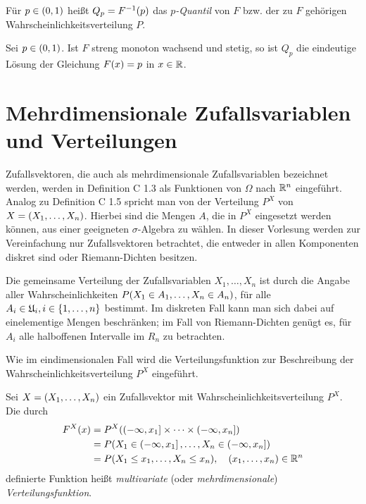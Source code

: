 \documentclass{lecture}
\begin{document}
    \begin{definition}
        Für \(p \in \parentheses*{0, 1}\) heißt \(Q_p = F^{-1}\parentheses*{p}\) das \emph{\(p\)-Quantil} von \(F\) bzw. der zu \(F\) gehörigen Wahrscheinlichkeitsverteilung \(P\).
    \end{definition}

    \begin{theorem}
        Sei \(p \in \parentheses*{0, 1}\).
        Ist \(F\) streng monoton wachsend und stetig, so ist \(Q_p\) die eindeutige Lösung der Gleichung \(F\parentheses*{x} = p\) in \(x \in \R\).
    \end{theorem}


    \section*{Mehrdimensionale Zufallsvariablen und Verteilungen}

    Zufallsvektoren, die auch als mehrdimensionale Zufallsvariablen bezeichnet werden, werden in Definition C 1.3 als Funktionen von \(\Omega\) nach \(\R^n\) eingeführt.
    Analog zu Definition C 1.5 spricht man von der Verteilung \(P^X\) von \(X = \parentheses*{X_1, \ldots, X_n}\).
    Hierbei sind die Mengen \(A\), die in \(P^X\) eingesetzt werden können, aus einer geeigneten \(\sigma\)-Algebra zu wählen.
    In dieser Vorlesung werden zur Vereinfachung nur Zufallsvektoren betrachtet, die entweder in allen Komponenten diskret sind oder Riemann-Dichten besitzen.

    Die gemeinsame Verteilung der Zufallsvariablen \(X_1, \ldots, X_n\) ist durch die Angabe aller Wahrscheinlichkeiten \(P\parentheses*{X_1 \in A_1, \ldots, X_n \in A_n}\), für alle \(A_i \in \mathfrak{U}_i, i \in \braces*{1, \ldots, n}\) bestimmt.
    Im diskreten Fall kann man sich dabei auf einelementige Mengen beschränken; im Fall von Riemann-Dichten genügt es, für \(A_i\) alle halboffenen Intervalle im \(R_n\) zu betrachten.
    
    Wie im eindimensionalen Fall wird die Verteilungsfunktion zur Beschreibung der Wahrscheinlichkeitsverteilung \(P^X\) eingeführt.

    \begin{definition}
        Sei \(X = \parentheses*{X_1, \ldots, X_n}\) ein Zufallsvektor mit Wahrscheinlichkeitsverteilung \(P^X\).
        Die durch
        \begin{align*}
            F^X\parentheses*{x} &= P^X\parentheses*{\left(-\infty, x_1\right] \times \cdots \times \left(-\infty, x_n\right]}\\
            &= P\parentheses*{X_1 \in \left(-\infty, x_1\right], \ldots, X_n \in \left(-\infty, x_n\right]}\\
            &= P\parentheses*{X_1 \le x_1, \ldots, X_n \le x_n}, \quad \parentheses*{x_1, \ldots, x_n} \in \R^n
        \end{align*}
        definierte Funktion heißt \emph{multivariate} (oder \emph{mehrdimensionale}) \emph{Verteilungsfunktion}.
    \end{definition}
\end{document}
